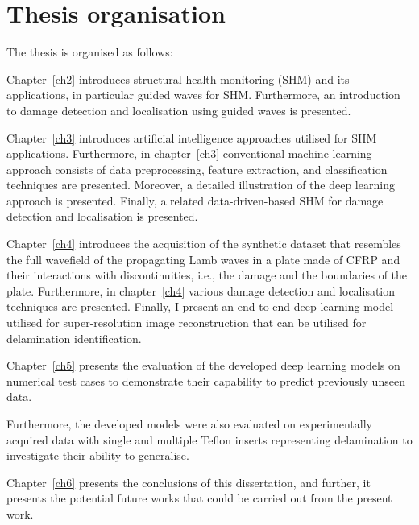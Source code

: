 \section{Thesis organisation}
\label{sec15}
The thesis is organised as follows:

Chapter~\ref{ch2} introduces structural health monitoring (SHM) and its applications, in particular guided waves for SHM.
Furthermore, an introduction to damage detection and localisation using guided waves is presented.

Chapter~\ref{ch3} introduces artificial intelligence approaches utilised for SHM applications.
Furthermore, in chapter~\ref{ch3}  conventional machine learning approach consists of data preprocessing, feature extraction, and classification techniques are presented.
Moreover, a detailed illustration of the deep learning approach is presented.
Finally, a related data-driven-based SHM for damage detection and localisation is presented.

Chapter~\ref{ch4} introduces the acquisition of the synthetic dataset that resembles the full wavefield of the propagating Lamb waves in a plate made of CFRP and their interactions with discontinuities, i.e., the damage and the boundaries of the plate.
Furthermore, in chapter~\ref{ch4} various damage detection and localisation techniques are presented.
Finally, I present an end-to-end deep learning model utilised for super-resolution image reconstruc\-tion that can be utilised for delamination identification.

Chapter~\ref{ch5} presents the evaluation of the developed deep learning models on numerical test cases to demonstrate their capability to predict previously unseen data.

Furthermore, the developed models were also evaluated on experimentally acquired data with single and multiple Teflon inserts representing delamination to investigate their ability to generalise.

Chapter~\ref{ch6} presents the conclusions of this dissertation, and further, it presents the potential future works that could be carried out from the present work.
